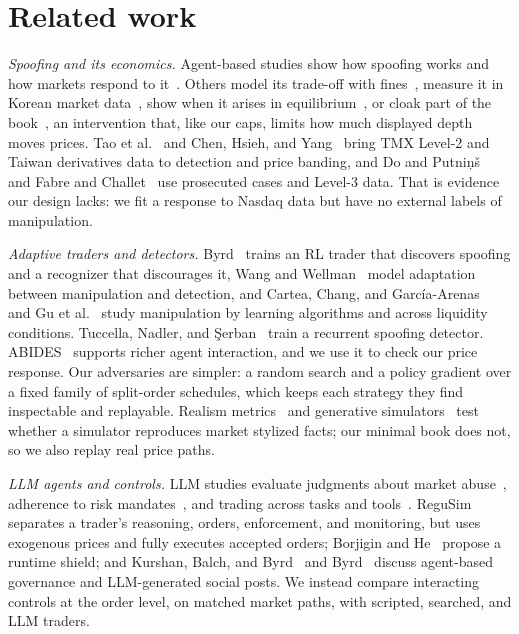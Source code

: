 \documentclass{article}
\begin{document}
\section{Related work}

\emph{Spoofing and its economics.} Agent-based studies show how spoofing works and how markets respond to it~\cite{r1,r7}. Others model its trade-off with fines~\cite{r18}, measure it in Korean market data~\cite{r34}, show when it arises in equilibrium~\cite{r35}, or cloak part of the book~\cite{r36}, an intervention that, like our caps, limits how much displayed depth moves prices. Tao et al.~\cite{r19} and Chen, Hsieh, and Yang~\cite{r20} bring TMX Level-2 and Taiwan derivatives data to detection and price banding, and Do and Putni\c{n}\v{s}~\cite{r13} and Fabre and Challet~\cite{r10} use prosecuted cases and Level-3 data. That is evidence our design lacks: we fit a response to Nasdaq data but have no external labels of manipulation.

\emph{Adaptive traders and detectors.} Byrd~\cite{r2} trains an RL trader that discovers spoofing and a recognizer that discourages it, Wang and Wellman~\cite{r3} model adaptation between manipulation and detection, and Cartea, Chang, and Garc\'{i}a-Arenas~\cite{r12} and Gu et al.~\cite{r17} study manipulation by learning algorithms and across liquidity conditions. Tuccella, Nadler, and \c{S}erban~\cite{r37} train a recurrent spoofing detector. ABIDES~\cite{r4} supports richer agent interaction, and we use it to check our price response. Our adversaries are simpler: a random search and a policy gradient over a fixed family of split-order schedules, which keeps each strategy they find inspectable and replayable. Realism metrics~\cite{r38} and generative simulators~\cite{r39} test whether a simulator reproduces market stylized facts; our minimal book does not, so we also replay real price paths.

\emph{LLM agents and controls.} LLM studies evaluate judgments about market abuse~\cite{r25}, adherence to risk mandates~\cite{r26}, and trading across tasks and tools~\cite{r27,r28,r29}. ReguSim~\cite{r8} separates a trader's reasoning, orders, enforcement, and monitoring, but uses exogenous prices and fully executes accepted orders; Borjigin and He~\cite{r9} propose a runtime shield; and Kurshan, Balch, and Byrd~\cite{r5} and Byrd~\cite{r11} discuss agent-based governance and LLM-generated social posts. We instead compare interacting controls at the order level, on matched market paths, with scripted, searched, and LLM traders.
\end{document}

